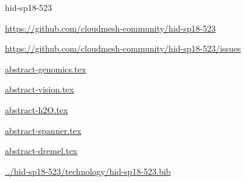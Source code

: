 \begin{IU}

hid-sp18-523

\url{https://github.com/cloudmesh-community/hid-sp18-523}

\url{https://github.com/cloudmesh-community/hid-sp18-523/issues}

\href{https://github.com/cloudmesh-community/hid-sp18-523/blob/master//technology/abstract-genomics.tex}{abstract-genomics.tex}

\href{https://github.com/cloudmesh-community/hid-sp18-523/blob/master//technology/abstract-vision.tex}{abstract-vision.tex}

\href{https://github.com/cloudmesh-community/hid-sp18-523/blob/master//technology/abstract-h2O.tex}{abstract-h2O.tex}

\href{https://github.com/cloudmesh-community/hid-sp18-523/blob/master//technology/abstract-spanner.tex}{abstract-spanner.tex}

\href{https://github.com/cloudmesh-community/hid-sp18-523/blob/master//technology/abstract-dremel.tex}{abstract-dremel.tex}

\href{https://github.com/cloudmesh-community/hid-sp18-523/blob/master//technology/hid-sp18-523.bib}{../hid-sp18-523/technology/hid-sp18-523.bib}

\end{IU}


